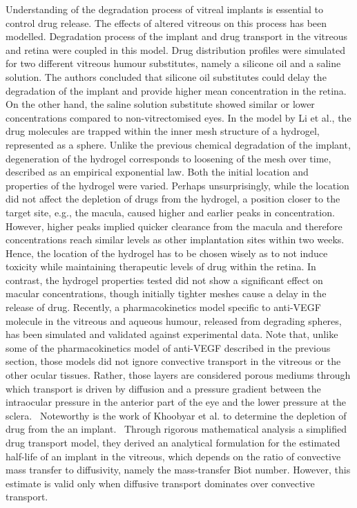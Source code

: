 \documentclass[12pt,a4paper]{journal}
\begin{document}
Understanding of the degradation process of vitreal implants is essential to control drug release.
The effects of altered vitreous on this process has been modelled.\cite{Ferreira_2020}
Degradation process of the implant and drug transport in the vitreous and retina were coupled in this model.
Drug distribution profiles were simulated for two different vitreous humour substitutes, namely a silicone oil and a saline solution.
The authors concluded that silicone oil substitutes could delay the degradation of the implant and provide higher mean concentration in the retina.
On the other hand, the saline solution substitute showed similar or lower concentrations compared to non-vitrectomised eyes.\cite{Ferreira_2020}
In the model by Li et al., the drug molecules are trapped within the inner mesh structure of a hydrogel, represented as a sphere.\cite{Li_2022}
Unlike the previous chemical degradation of the implant, degeneration of the hydrogel corresponds to loosening of the mesh over time, described as an empirical exponential law.
Both the initial location and properties of the hydrogel were varied.
Perhaps unsurprisingly, while the location did not affect the depletion of drugs from the hydrogel, a position closer to the target site, e.g., the macula, caused higher and earlier peaks in concentration.
However, higher peaks implied quicker clearance from the macula and therefore concentrations reach similar levels as other implantation sites within two weeks.\cite{Li_2022}
Hence, the location of the hydrogel has to be chosen wisely as to not induce toxicity while maintaining therapeutic levels of drug within the retina.
In contrast, the hydrogel properties tested did not show a significant effect on macular concentrations, though initially tighter meshes cause a delay in the release of drug.
Recently, a pharmacokinetics model specific to anti-VEGF molecule in the vitreous and aqueous humour, released from degrading spheres, has been simulated and validated against experimental data.\cite{Heljak_2022}
Note that, unlike some of the pharmacokinetics model of anti-VEGF described in the previous section, those models did not ignore convective transport in the vitreous or the other ocular tissues.
Rather, those layers are considered porous mediums through which transport is driven by diffusion and a pressure gradient between the intraocular pressure in the anterior part of the eye and the lower pressure at the sclera.~\cite{Ferreira_2018,Ferreira_2020,Heljak_2022,Khoobyar_2021,Li_2022}
Noteworthy is the work of Khoobyar et al. to determine the depletion of drug from the an implant.~\cite{Khoobyar_2022}
Through rigorous mathematical analysis a simplified drug transport model, they derived an analytical formulation for the estimated half-life of an implant in the vitreous, which depends on the ratio of convective mass transfer to diffusivity, namely the mass-transfer Biot number.
However, this estimate is valid only when diffusive transport dominates over convective transport.
\end{document}
